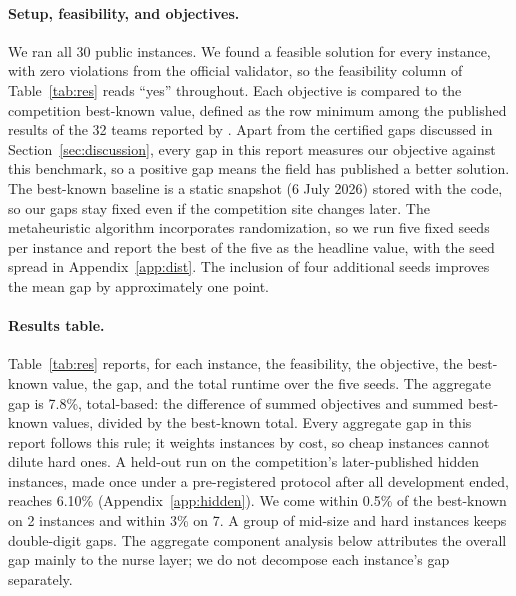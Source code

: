 \documentclass[11pt]{article}
\begin{document}
	\paragraph{Setup, feasibility, and objectives.}
	We ran all 30 public instances. We found a feasible solution for every instance, with zero violations from the official validator, so the feasibility column of Table~\ref{tab:res} reads ``yes'' throughout. Each objective is compared to the competition best-known value, defined as the row
	minimum among the published results of the 32 teams reported by \citet{ihtc2024site}. Apart from the certified gaps discussed in Section~\ref{sec:discussion}, every gap in this report measures our objective against this benchmark, so a positive gap means the
	field has published a better solution. The best-known baseline is a static snapshot
	(6 July 2026) stored with the code, so our gaps stay fixed even if the competition site changes
	later. The metaheuristic algorithm incorporates randomization, so we run five fixed seeds per instance and report the best of the five as the headline value, with the seed spread in Appendix~\ref{app:dist}. The inclusion of four additional seeds improves the mean gap by approximately one point.
	
	\paragraph{Results table.}
	Table~\ref{tab:res} reports, for each instance, the feasibility, the objective, the best-known
	value, the gap, and the total runtime over the five seeds. The aggregate gap is 7.8\%, total-based:
	the difference of summed objectives and summed best-known values, divided by the best-known
	total. Every aggregate gap in this report follows this rule; it weights instances by cost, so cheap instances cannot dilute hard ones. A
held-out run on the competition's later-published hidden instances, made once under a
pre-registered protocol after all development ended, reaches 6.10\%
(Appendix~\ref{app:hidden}). We come
	within 0.5\% of the best-known on 2 instances and within 3\% on 7. A group of mid-size and hard
	instances keeps double-digit gaps. The aggregate component analysis below attributes the overall
	gap mainly to the nurse layer; we do not decompose each instance's gap separately.
	
	\begin{table}[!ht]
		\caption{Results on the 30 public instances. Best-known is the benchmark, and the gap is measured against it. Runtime is the total over five seeds, since the headline is the best of those runs and the winning seed's time alone would understate the compute spent.}\label{tab:res}
		
	\end{table}
\end{document}
